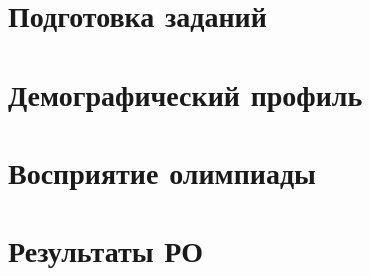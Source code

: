 \documentclass[12pt,openany]{extbook}
\begin{document}
\def\contentsname{Содержание}
\tableofcontents



\chapter{Подготовка заданий}


\chapter{Демографический профиль}


\chapter{Восприятие олимпиады}


\chapter{Результаты РО}

\end{document}
